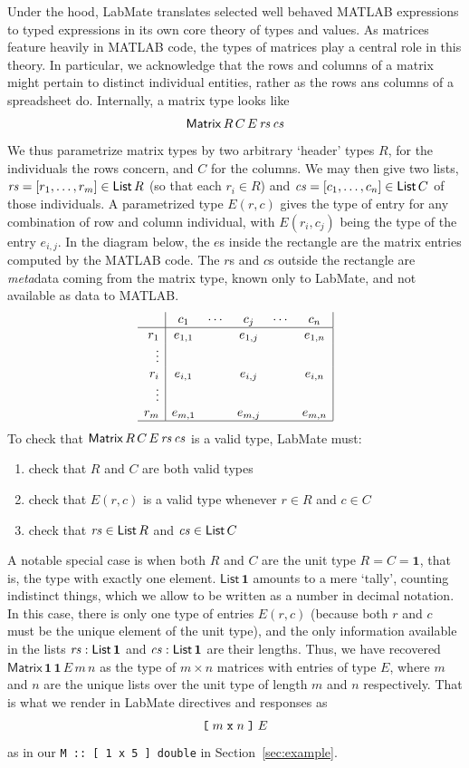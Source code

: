 \documentclass{IMEKO2024}
\newcommand{\lsb}{\texttt{\symbol{91}}}
\newcommand{\rsb}{\texttt{\symbol{93}}}
\newcommand{\One}{\mathbf{1}}
\newcommand{\Matrix}[5]{\mathsf{Matrix}\,#1\,#2\,#3\,#4\,#5}
\newcommand{\List}[1]{\mathsf{List}\,#1}
\newcommand{\remph}{\emph}
\newcommand{\param}{parametrize}
\begin{document}
Under the hood, LabMate translates selected well behaved MATLAB expressions
to typed expressions in its own core theory of types and values.
%
As matrices feature heavily in MATLAB code, the types of matrices
play a central role in this theory.
%
In particular, we acknowledge that the rows and columns of a matrix might pertain to distinct individual entities, rather as the rows ans columns of a spreadsheet do.
%
Internally, a matrix type looks like
\[\Matrix{R}{C}{E}{\rs}{\cs}
\]
%
We thus \param{} matrix types by two arbitrary `header' types $R$, for the individuals the rows concern, and $C$ for the columns. We may then give two lists, $\rs = [r_1,\ldots,r_m]\in\List{R}$ (so that each $r_i\in R$) and $\cs = [c_1,\ldots,c_n]\in\List{C}$ of those individuals. A \param{}d type $E(r,c)$ gives the type of entry for any combination of row and column individual, with $E(r_i,c_j)$ being the type of the entry $e_{i,j}$. In the diagram below, the $e$s inside the rectangle are the matrix entries computed by the MATLAB code. The $r$s and $c$s outside the rectangle are \remph{meta}data coming from the matrix type, known only to LabMate, and not available as data to MATLAB.
\[\begin{array}{r|ccccc|}
\; & c_1      & \cdots & c_j     & \cdots & c_n     \\
\hline
r_1    & e_{1,1}  &        & e_{1,j} &        & e_{1,n} \\
\vdots &          &        &         &        &         \\
r_i    & e_{i,1}  &        & e_{i,j} &        & e_{i,n} \\
\vdots &          &        &         &        &         \\
r_m    & e_{m,1}  &        & e_{m,j} &        & e_{m,n}  \\
\hline
\end{array}\]
To check that $\Matrix{R}{C}{E}{\rs}{\cs}$ is a valid type, LabMate must:
\begin{enumerate}
\item check that $R$ and $C$ are both valid types
\item check that $E(r,c)$ is a valid type whenever $r\in R$ and $c\in C$
\item check that $\rs\in\List{R}$ and $\cs\in\List{C}$
\end{enumerate}

A notable special case is when both $R$ and $C$ are the unit type $R = C = \One$, that is, the type with exactly one element.
%
$\List{\One}$ amounts to a mere `tally', counting indistinct things, which we allow to be written as a number in decimal notation.
%
In this case, there is only one type of entries $E(r,c)$ (because both $r$
and $c$ must be the unique element of the unit type), and the only
information available in the lists $\rs : \List{\One}$ and
$\cs : \List{\One}$ are their lengths.
%
Thus, we have recovered $\Matrix{\One}{\One}{E}{m}{n}$ as the type of
$m \times n$ matrices with entries of type $E$, where $m$ and $n$ are
the unique lists over the unit type of length $m$ and $n$
respectively.
%
That is what we render in LabMate directives and responses as
\[
\lsb \;m \;\texttt{x}\; n\; \rsb\; E
\]
as in our \texttt{M :: [ 1 x 5 ] double} in Section~\ref{sec:example}.
\end{document}
